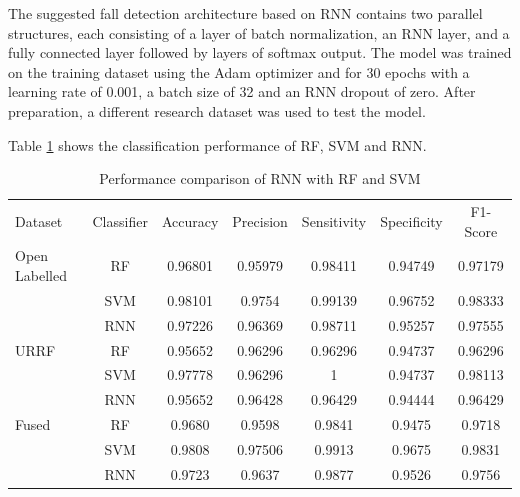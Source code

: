 \vspace{.5cm}
The suggested fall detection architecture based on RNN contains two parallel structures, each consisting of a layer of batch normalization, an RNN layer, and a fully connected layer followed by layers of softmax output. The model was trained on the training dataset using the Adam optimizer and for 30 epochs with a learning rate of 0.001, a batch size of 32 and an RNN dropout of zero. After preparation, a different research dataset was used to test the model.


\vspace{.5cm}
Table \ref{resulttab:2} shows the classification performance of RF, SVM and RNN.

\begin{table}[!ht]
    \centering
     \scriptsize
    \begin{tabular}{lcccccc}
    \toprule
      Dataset &Classifier& Accuracy& Precision&Sensitivity&Specificity&F1-Score \\\cmidrule{1-7}
        Open Labelled&RF & 0.96801&0.95979&0.98411&0.94749 & 0.97179\\ \cmidrule{2-7}
          &SVM  &0.98101 &0.9754&0.99139&0.96752&0.98333\\\cmidrule{2-7}
           & RNN  &0.97226&0.96369 & 0.98711&0.95257&0.97555 \\ \midrule
        URRF & RF &0.95652&0.96296&0.96296&0.94737&0.96296 \\ \cmidrule{2-7}
          &SVM  &0.97778	 &0.96296	&1	&0.94737&0.98113	\\\cmidrule{2-7}
           & RNN  &0.95652 &0.96428& 0.96429&0.94444&0.96429 \\\midrule
          Fused&RF &0.9680 &0.9598&0.9841&0.9475&0.9718 \\ \cmidrule{2-7}
          &SVM  &0.9808 &0.97506&0.9913&0.9675&0.9831\\\cmidrule{2-7}
           & RNN  &0.9723 &0.9637& 0.9877&0.9526&0.9756 \\\bottomrule
             		
    \end{tabular}
    \caption{Performance comparison of RNN with RF and SVM}
    \label{resulttab:2}
\end{table}


